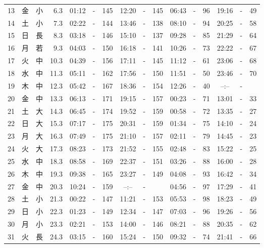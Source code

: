 \documentclass[12pt.a4j]{jsarticle}
\begin{document}
\begin{center}
\begin{table}[ht]
\begin{tabular}{|rc|cr|ccrccr|ccrccr|}
13 & 金 & 小 &  6.3 &  01:12 &-& 145  &  12:20 &-& 145  &   06:43 &-&  96  &   19:16 &-&  49  \\
14 & 土 & 小 &  7.3 &  02:22 &-& 144  &  13:46 &-& 138  &   08:10 &-&  94  &   20:25 &-&  58  \\
15 & 日 & 長 &  8.3 &  03:18 &-& 146  &  15:10 &-& 137  &   09:28 &-&  85  &   21:29 &-&  64  \\
16 & 月 & 若 &  9.3 &  04:03 &-& 150  &  16:18 &-& 141  &   10:26 &-&  73  &   22:22 &-&  67  \\
17 & 火 & 中 & 10.3 &  04:39 &-& 156  &  17:11 &-& 145  &   11:12 &-&  61  &   23:06 &-&  68  \\
18 & 水 & 中 & 11.3 &  05:11 &-& 162  &  17:56 &-& 150  &   11:51 &-&  50  &   23:46 &-&  70  \\
19 & 木 & 中 & 12.3 &  05:42 &-& 167  &  18:36 &-& 154  &   12:26 &-&  40  &   --:-- &-&     \\
20 & 金 & 中 & 13.3 &  06:13 &-& 171  &  19:15 &-& 157  &   00:23 &-&  71  &   13:01 &-&  33  \\
21 & 土 & 大 & 14.3 &  06:45 &-& 174  &  19:52 &-& 159  &   00:58 &-&  72  &   13:35 &-&  27  \\
22 & 日 & 大 & 15.3 &  07:17 &-& 175  &  20:31 &-& 159  &   01:34 &-&  75  &   14:10 &-&  24  \\
23 & 月 & 大 & 16.3 &  07:49 &-& 175  &  21:10 &-& 157  &   02:11 &-&  79  &   14:45 &-&  23  \\
24 & 火 & 大 & 17.3 &  08:23 &-& 173  &  21:52 &-& 155  &   02:48 &-&  83  &   15:22 &-&  25  \\
25 & 水 & 中 & 18.3 &  08:58 &-& 169  &  22:37 &-& 151  &   03:26 &-&  88  &   16:00 &-&  28  \\
26 & 木 & 中 & 19.3 &  09:38 &-& 165  &  23:27 &-& 149  &   04:08 &-&  93  &   16:42 &-&  34  \\
27 & 金 & 中 & 20.3 &  10:24 &-& 159  &  --:-- &-&     &   04:56 &-&  97  &   17:29 &-&  41  \\
28 & 土 & 小 & 21.3 &  00:22 &-& 147  &  11:21 &-& 153  &   05:53 &-&  98  &   18:23 &-&  49  \\
29 & 日 & 小 & 22.3 &  01:23 &-& 149  &  12:34 &-& 147  &   07:03 &-&  96  &   19:26 &-&  56  \\
30 & 月 & 小 & 23.3 &  02:21 &-& 153  &  14:00 &-& 146  &   08:21 &-&  88  &   20:35 &-&  62  \\
31 & 火 & 長 & 24.3 &  03:15 &-& 160  &  15:24 &-& 150  &   09:32 &-&  74  &   21:41 &-&  66  \\

\end{tabular}
\end{table}
\end{center}
\end{document}
